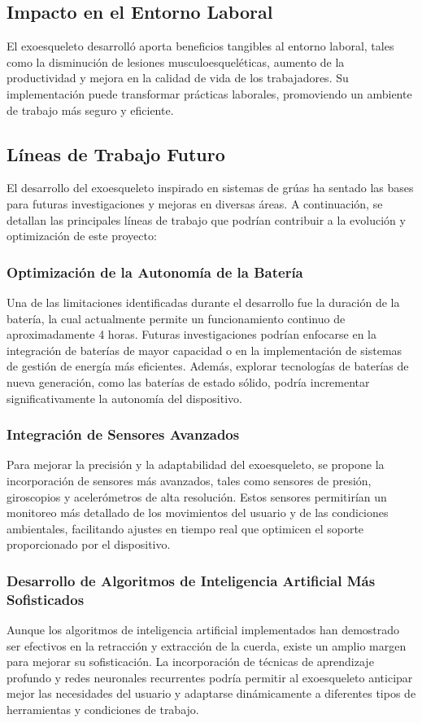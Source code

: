 \subsection{Impacto en el Entorno Laboral}
El exoesqueleto desarrolló aporta beneficios tangibles al entorno laboral, tales como la disminución de lesiones musculoesqueléticas, aumento de la productividad y mejora en la calidad de vida de los trabajadores. Su implementación puede transformar prácticas laborales, promoviendo un ambiente de trabajo más seguro y eficiente.

\subsection{Líneas de Trabajo Futuro}

El desarrollo del exoesqueleto inspirado en sistemas de grúas ha sentado las bases para futuras investigaciones y mejoras en diversas áreas. A continuación, se detallan las principales líneas de trabajo que podrían contribuir a la evolución y optimización de este proyecto:

\subsubsection{Optimización de la Autonomía de la Batería}
Una de las limitaciones identificadas durante el desarrollo fue la duración de la batería, la cual actualmente permite un funcionamiento continuo de aproximadamente 4 horas. Futuras investigaciones podrían enfocarse en la integración de baterías de mayor capacidad o en la implementación de sistemas de gestión de energía más eficientes. Además, explorar tecnologías de baterías de nueva generación, como las baterías de estado sólido, podría incrementar significativamente la autonomía del dispositivo.

\subsubsection{Integración de Sensores Avanzados}
Para mejorar la precisión y la adaptabilidad del exoesqueleto, se propone la incorporación de sensores más avanzados, tales como sensores de presión, giroscopios y acelerómetros de alta resolución. Estos sensores permitirían un monitoreo más detallado de los movimientos del usuario y de las condiciones ambientales, facilitando ajustes en tiempo real que optimicen el soporte proporcionado por el dispositivo.

\subsubsection{Desarrollo de Algoritmos de Inteligencia Artificial Más Sofisticados}
Aunque los algoritmos de inteligencia artificial implementados han demostrado ser efectivos en la retracción y extracción de la cuerda, existe un amplio margen para mejorar su sofisticación. La incorporación de técnicas de aprendizaje profundo y redes neuronales recurrentes podría permitir al exoesqueleto anticipar mejor las necesidades del usuario y adaptarse dinámicamente a diferentes tipos de herramientas y condiciones de trabajo.

